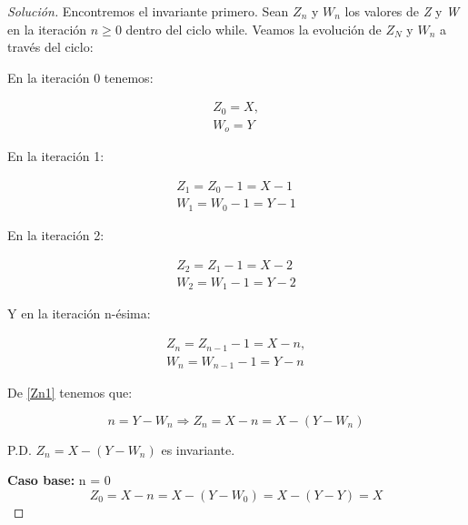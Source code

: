 \begin{proof}[Solución]

  Encontremos el invariante primero. Sean $Z_n$ y $W_n$ los valores de
  \textit{Z} y \textit{W} en la iteración $n \ge 0$ dentro del ciclo
  while. Veamos la evolución de $Z_N$ y $W_n$ a través del ciclo:

  En la iteración 0 tenemos:

  \begin{equation*}
    \begin{split}
      Z_0 = X,\\W_o = Y
    \end{split}
  \end{equation*}

  En la iteración 1:

  \begin{equation*}
    \begin{split}
      Z_1 = Z_0 - 1 = X - 1\\W_1 = W_0 - 1 = Y - 1
    \end{split}
  \end{equation*}

  En la iteración 2:

  \begin{equation*}
    \begin{split}
      Z_2 = Z_1 - 1 = X - 2\\W_2 = W_1 -  1 = Y - 2
    \end{split}
  \end{equation*}

  Y en la iteración n-ésima:

  \begin{equation}
    \label{Zn1}
    \begin{split}
      Z_n = Z_{n-1} - 1 = X - n, \\W_n = W_{n-1} - 1 = Y - n
    \end{split}
  \end{equation}

  De \ref{Zn1} tenemos que:

  \begin{equation}
    n = Y - W_n \Rightarrow Z_n = X - n = X - (Y - W_n)
  \end{equation}

  P.D. $Z_n = X  - (Y - W_n)$ es invariante.

  \textbf{Caso base: } n = 0\\
  \begin{equation*}
    Z_0 = X - n = X - (Y - W_0) = X - (Y - Y) = X
  \end{equation*}


\end{proof}
